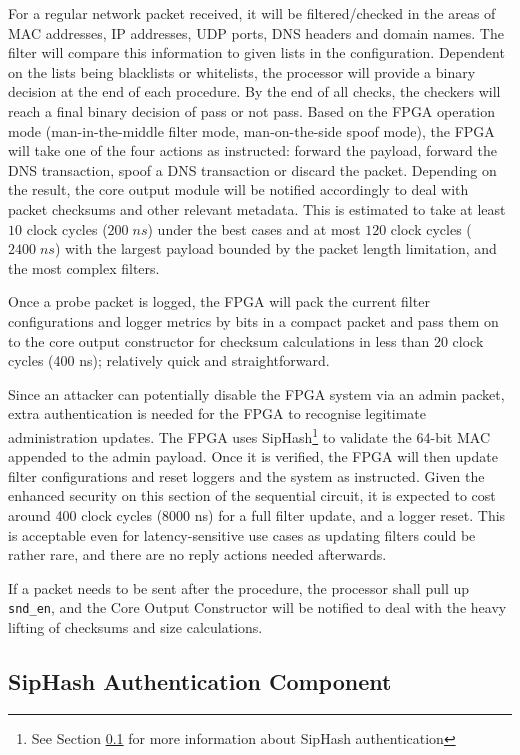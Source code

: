 \documentclass[a4paper]{report}
\newcommand{\code}{\texttt}
\begin{document}
For a regular network packet received, it will be filtered/checked in the areas of MAC addresses, IP addresses, UDP ports, DNS headers and domain names. The filter will compare this information to given lists in the configuration. Dependent on the lists being blacklists or whitelists, the processor will provide a binary decision at the end of each procedure. By the end of all checks, the checkers will reach a final binary decision of pass or not pass. Based on the FPGA operation mode (man-in-the-middle filter mode, man-on-the-side spoof mode), the FPGA will take one of the four actions as instructed: forward the payload, forward the DNS transaction, spoof a DNS transaction or discard the packet. Depending on the result, the core output module will be notified accordingly to deal with packet checksums and other relevant metadata. This is estimated to take at least $10$ clock cycles ($200\; ns$) under the best cases and at most $120$ clock cycles ($2400\; ns$) with the largest payload bounded by the packet length limitation, and the most complex filters.  

Once a probe packet is logged, the FPGA will pack the current filter configurations and logger metrics by bits in a compact packet and pass them on to the core output constructor for checksum calculations in less than 20 clock cycles (400 ns); relatively quick and straightforward.

Since an attacker can potentially disable the FPGA system via an admin packet, extra authentication is needed for the FPGA to recognise legitimate administration updates. The FPGA uses SipHash\footnote{See Section \ref{section:implementation-hardware-implementation-siphash} for more information about SipHash authentication} to validate the 64-bit MAC appended to the admin payload. Once it is verified, the FPGA will then update filter configurations and reset loggers and the system as instructed. Given the enhanced security on this section of the sequential circuit, it is expected to cost around 400 clock cycles (8000 ns) for a full filter update, and a logger reset. This is acceptable even for latency-sensitive use cases as updating filters could be rather rare, and there are no reply actions needed afterwards.

If a packet needs to be sent after the procedure, the processor shall pull up \code{snd\_en}, and the Core Output Constructor will be notified to deal with the heavy lifting of checksums and size calculations.

\subsection{SipHash Authentication Component}
\label{section:implementation-hardware-implementation-siphash}
\end{document}
